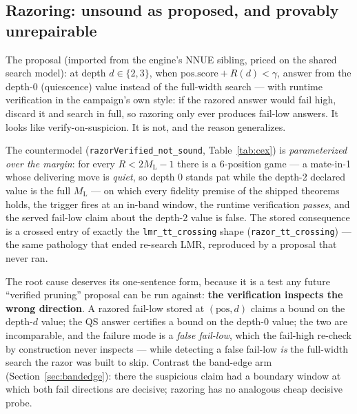 \documentclass[11pt]{article}
\newcommand{\ML}{M_{\mathrm{L}}}    %
\theoremstyle{plain}
\theoremstyle{definition}
\theoremstyle{remark}
\begin{document}
\subsection{Razoring: unsound as proposed, and provably unrepairable}
\label{sec:razoring}

The proposal (imported from the engine's NNUE sibling, priced on the
shared search model): at depth $d \in \{2, 3\}$, when
$\mathrm{pos.score} + R(d) < \gamma$, answer from the depth-0
(quiescence) value instead of the full-width search --- with runtime
verification in the campaign's own style: if the razored answer would
fail high, discard it and search in full, so razoring only ever
produces fail-low answers.  It looks like verify-on-suspicion.  It is
not, and the reason generalizes.

The countermodel (\texttt{razorVerified\_not\_sound},
Table~\ref{tab:cex}) is \emph{parameterized over the margin}: for
every $R < 2\ML - 1$ there is a 6-position game --- a mate-in-1 whose
delivering move is \emph{quiet}, so depth 0 stands pat while the
depth-2 declared value is the full $\ML$ --- on which every fidelity
premise of the shipped theorems holds, the trigger fires at an in-band
window, the runtime verification \emph{passes}, and the served
fail-low claim about the depth-2 value is false.  The stored
consequence is a crossed entry of exactly the
\texttt{lmr\_tt\_crossing} shape (\texttt{razor\_tt\_crossing}) ---
the same pathology that ended re-search LMR, reproduced by a proposal
that never ran.

The root cause deserves its one-sentence form, because it is a test
any future ``verified pruning'' proposal can be run against:
\textbf{the verification inspects the wrong direction}.  A razored
fail-low stored at $(\mathrm{pos}, d)$ claims a bound on the
depth-$d$ value; the QS answer certifies a bound on the depth-0
value; the two are incomparable, and the failure mode is a
\emph{false fail-low}, which the fail-high re-check by construction
never inspects --- while detecting a false fail-low \emph{is} the
full-width search the razor was built to skip.  Contrast the
band-edge arm (Section~\ref{sec:bandedge}): there the suspicious
claim had a boundary window at which both fail directions are
decisive; razoring has no analogous cheap decisive probe.
\end{document}
